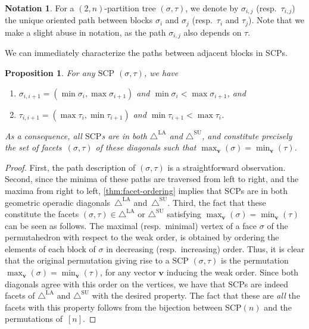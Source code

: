 \documentclass{amsart}
\newtheorem{proposition}[theorem]{Proposition}
\theoremstyle{definition}
\newtheorem{notation}[theorem]{Notation}
\renewcommand{\b}[1]{{\boldsymbol{#1}}} %
\newcommand{\resp}{resp.~} %
\renewcommand{\b}[1]{\boldsymbol{#1}} %
\newcommand{\SUD}{\triangle^{\mathrm{SU}}}
\newcommand{\LAD}{\triangle^{\mathrm{LA}}}
\newcommand{\SCP}{\mathrm{SCP}}
\begin{document}
\begin{notation}
For a $(2,n)$-partition tree $(\sigma,\tau)$, we denote by $\sigma_{i,j}$ (\resp $\tau_{i,j}$) the unique oriented path between blocks $\sigma_{i}$ and $\sigma_j$ (\resp $\tau_{i}$ and $\tau_j$).
Note that we make a slight abuse in notation, as the path $\sigma_{i,j}$ also depends on $\tau$.
\end{notation}

We can immediately characterize the paths between adjacent blocks in $\SCP$s.

\begin{proposition} 
\label{lem:SCP-path-desc}
For any $\SCP$ $(\sigma,\tau)$, we have
\begin{enumerate}
\item $ \sigma_{i,i+1} = ( \min \sigma_i, \max \sigma_{i+1} )$ and $\min \sigma_i< \max \sigma_{i+1}$, and
\item $  \tau_{i,i+1} =  ( \max \tau_i, \min \tau_{i+1} )$ and $\min \tau_{i+1}< \max \tau_{i}$.
\end{enumerate}
As a consequence, all $\SCP$s are in both $\LAD$ and $\SUD$, and constitute precisely the set of facets~$(\sigma,\tau)$ of these diagonals such that $\max_{\b{v}}(\sigma) = \min_{\b{v}}(\tau)$.
\end{proposition}
\begin{proof}
First, the path description of $(\sigma,\tau)$ is a straightforward observation. 
Second, since the minima of these paths are traversed from left to right, and the maxima from right to left, \cref{thm:facet-ordering} implies that $\SCP$s are in both geometric operadic diagonals~$\LAD$ and~$\SUD$.
Third, the fact that these constitute the facets $(\sigma,\tau) \in \LAD$ or $\SUD$ satisfying $\max_{\b{v}}(\sigma) = \min_{\b{v}}(\tau)$ can be seen as follows.
The maximal (\resp minimal) vertex of a face $\sigma$ of the permutahedron with respect to the weak order, is obtained by ordering the elements of each block of $\sigma$ in decreasing (\resp increasing) order. 
Thus, it is clear that the original permutation giving rise to a $\SCP$ $(\sigma,\tau)$ is the permutation $\max_{\b{v}}(\sigma)=\min_{\b{v}}(\tau)$, for any vector $\b{v}$ inducing the weak order.
Since both diagonals agree with this order on the vertices, we have that $\SCP$s are indeed facets of $\LAD$ and $\SUD$ with the desired property. 
The fact that these are \emph{all} the facets with this property follows from the bijection between $\SCP(n)$ and the permutations of~$[n]$.
\end{proof}
\end{document}
